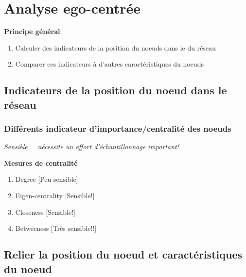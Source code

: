 \documentclass{beamer}
\begin{document}
\section{Analyse ego-centrée}


\begin{frame}
 
 
 {\bf Principe général}: 
 \begin{enumerate}
  \item Calculer des indicateurs de la position du noeuds dans le   du réseau
  \item Comparer ces indicateurs à d'autres caractéristiques du noeuds
 \end{enumerate}

 
 
 
 
\end{frame}

\subsection{Indicateurs de la position du noeud dans le réseau}




\begin{frame}



\frametitle{Différents indicateur d'importance/centralité des noeuds}



{\it Sensible =  nécessite un effort d'échantillonnage important!} 


\medskip 

{\bf Mesures de centralité}
\begin{enumerate}
 \item Degree [Peu sensible]
 \item Eigen-centrality [Sensible!]
 \item Closeness [Sensible!]
 \item Betweeness [Très sensible!!]
\end{enumerate}




\end{frame}







\subsection{Relier la position du noeud et caractéristiques du noeud }
\end{document}
